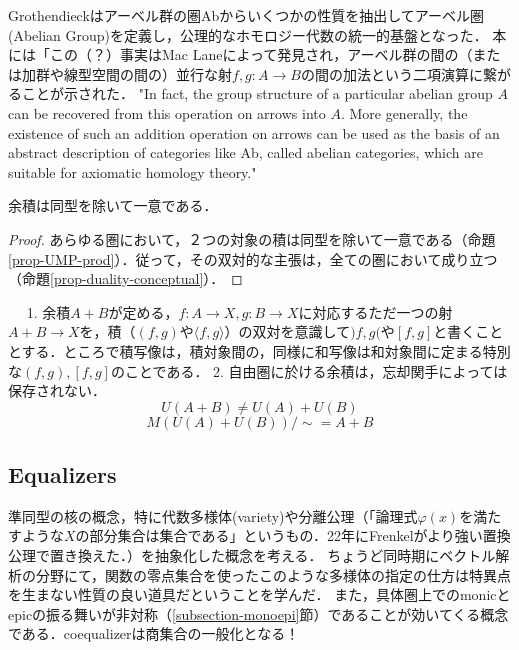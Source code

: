\documentclass[uplatex, dvipdfmx]{jsarticle}
\begin{document}
\begin{example}
\begin{remark*}
        Grothendieckはアーベル群の圏Abからいくつかの性質を抽出してアーベル圏(Abelian Group)を定義し，公理的なホモロジー代数の統一的基盤となった．
        本には「この（？）事実はMac Laneによって発見され，アーベル群の間の（または加群や線型空間の間の）並行な射$f,g:A\to B$の間の加法という二項演算に繋がることが示された．
        "In fact, the group structure of a particular abelian group $A$ can be recovered from this operation on arrows into $A$. More generally, the existence of such an addition operation on arrows can be used as the basis of an abstract description of categories like Ab, called abelian categories, which are suitable for axiomatic homology theory."
    \end{remark*}
\end{example}

\begin{proposition}
    余積は同型を除いて一意である．
\end{proposition}
\begin{proof}
    あらゆる圏において，２つの対象の積は同型を除いて一意である（命題\ref{prop-UMP-prod}）．従って，その双対的な主張は，全ての圏において成り立つ（命題\ref{prop-duality-conceptual}）．
\end{proof}

\begin{screen}　
    1. 余積$A+ B$が定める，$f:A\to X, g:B\to X$に対応するただ一つの射$A+B\to X$を，積（$(f,g)$や$\langle f,g\rangle$）の双対を意識して$)f,g($や$[f,g]$と書くこととする．ところで積写像は，積対象間の，同様に和写像は和対象間に定まる特別な$(f,g),[f,g]$のことである．
    2. 自由圏に於ける余積は，忘却関手によっては保存されない．
    \[ U(A+B)\ne U(A)+U(B) \]
    \[ M(U(A)+U(B))/\sim = A+B \]
\end{screen}

\subsection{Equalizers}
準同型の核の概念，特に代数多様体(variety)や分離公理（「論理式$\varphi(x)$を満たすような$X$の部分集合は集合である」というもの．22年にFrenkelがより強い置換公理で置き換えた．）を抽象化した概念を考える．
ちょうど同時期にベクトル解析の分野にて，関数の零点集合を使ったこのような多様体の指定の仕方は特異点を生まない性質の良い道具だということを学んだ．
また，具体圏上でのmonicとepicの振る舞いが非対称（\ref{subsection-monoepi}節）であることが効いてくる概念である．coequalizerは商集合の一般化となる！
\end{document}
